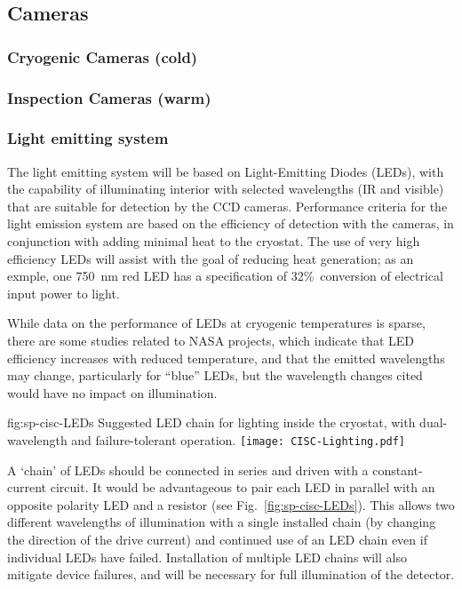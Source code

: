 \subsection{Cameras}
\label{sec:fdsp-slow-cryo-cameras}


\subsubsection{Cryogenic Cameras (cold)}

\subsubsection{Inspection Cameras (warm)}

\subsubsection{Light emitting system}
The light emitting system will be based on Light-Emitting Diodes (LEDs),
with the capability of illuminating interior with selected wavelengths
(IR and visible) that are suitable for detection by the CCD cameras.
Performance criteria for the light emission system are based on the
efficiency of detection with the cameras, in conjunction with adding
minimal heat to the cryostat. The use of very high efficiency LEDs will
assist with the goal of reducing heat generation; as an exmple, one
\SI{750}{nm}
red LED has a specification of 32\%\ conversion of
electrical input power to light. 

While data on the performance of LEDs at cryogenic temperatures is sparse,
there are some studies related to NASA projects\cite{Carron:2017zzz}, which
indicate that LED efficiency increases with reduced temperature,
and that the emitted wavelengths may change, particularly for ``blue'' LEDs,
but the wavelength changes cited would have no impact on illumination.

\begin{dunefigure}{fig:sp-cisc-LEDs}
  {Suggested LED chain for lighting inside the cryostat, with
    dual-wavelength and failure-tolerant operation.}
\texttt{[image: CISC-Lighting.pdf]}
\end{dunefigure}

A `chain' of LEDs should be connected in series and driven with a
constant-current circuit. It would be advantageous to pair each
LED in parallel with an opposite polarity LED and a resistor
(see Fig.~\ref{fig:sp-cisc-LEDs}).
This allows two different wavelengths of illumination with a single installed
chain (by changing the direction of the drive current) and 
continued use of an LED chain even if individual LEDs have failed.
Installation of multiple LED chains will also mitigate device failures,
and will be necessary for full illumination of the detector.
